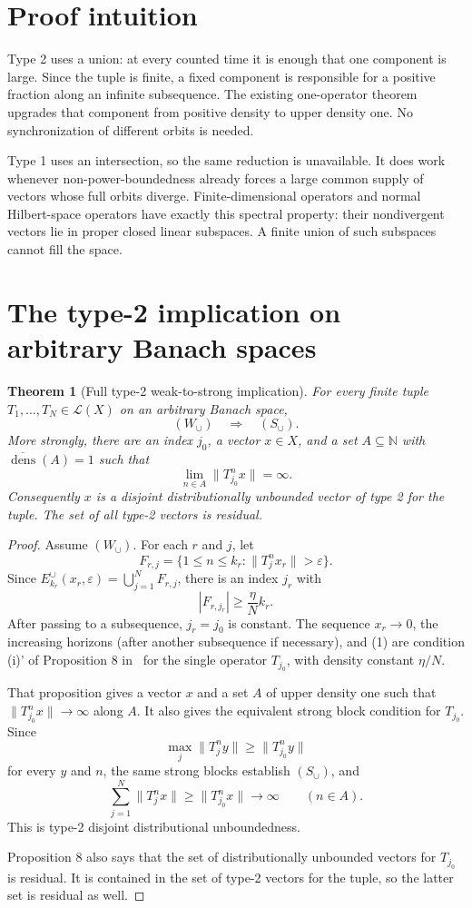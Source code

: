 \documentclass[11pt]{article}
\newtheorem{theorem}{Theorem}
\newcommand{\N}{\mathbb N}
\newcommand{\cL}{\mathcal L}
\newcommand{\dens}{\operatorname{dens}}
\begin{document}
\section{Proof intuition}

Type 2 uses a union: at every counted time it is enough that one component is
large.  Since the tuple is finite, a fixed component is responsible for a
positive fraction along an infinite subsequence.  The existing
one-operator theorem upgrades that component from positive density to upper
density one.  No synchronization of different orbits is needed.

Type 1 uses an intersection, so the same reduction is unavailable.  It does
work whenever non-power-boundedness already forces a large common supply of
vectors whose full orbits diverge.  Finite-dimensional operators and normal
Hilbert-space operators have exactly this spectral property: their
nondivergent vectors lie in proper closed linear subspaces.  A finite union of
such subspaces cannot fill the space.

\section{The type-2 implication on arbitrary Banach spaces}

\begin{theorem}[Full type-2 weak-to-strong implication]\label{thm:type2}
For every finite tuple $T_1,\ldots,T_N\in\cL(X)$ on an arbitrary Banach
space,
\[
 (W_\cup)\quad\Longrightarrow\quad(S_\cup).
\]
More strongly, there are an index $j_0$, a vector $x\in X$, and a set
$A\subseteq\N$ with $\overline{\dens}(A)=1$ such that
\[
 \lim_{n\in A}\|T_{j_0}^nx\|=\infty.
\]
Consequently $x$ is a disjoint distributionally unbounded vector of type 2
for the tuple.  The set of all type-2 vectors is residual.
\end{theorem}

\begin{proof}
Assume $(W_\cup)$.  For each $r$ and $j$, let
\[
 F_{r,j}=\{1\leq n\leq k_r:\|T_j^nx_r\|>\varepsilon\}.
\]
Since $E_{k_r}^\cup(x_r,\varepsilon)=\bigcup_{j=1}^NF_{r,j}$, there is an
index $j_r$ with
\[
 |F_{r,j_r}|\geq\frac{\eta}{N}k_r.                         \tag{1}
\]
After passing to a subsequence, $j_r=j_0$ is constant.  The sequence
$x_r\to0$, the increasing horizons (after another subsequence if necessary),
and (1) are condition (i)' of Proposition 8 in~\cite{BBMP} for the single
operator $T_{j_0}$, with density constant $\eta/N$.

That proposition gives a vector $x$ and a set $A$ of upper density one such
that $\|T_{j_0}^nx\|\to\infty$ along $A$.  It also gives the equivalent
strong block condition for $T_{j_0}$.  Since
\[
 \max_j\|T_j^ny\|\geq\|T_{j_0}^ny\|
\]
for every $y$ and $n$, the same strong blocks establish $(S_\cup)$, and
\[
 \sum_{j=1}^N\|T_j^nx\|\geq\|T_{j_0}^nx\|\longrightarrow\infty
 \qquad(n\in A).
\]
This is type-2 disjoint distributional unboundedness.

Proposition 8 also says that the set of distributionally unbounded vectors
for $T_{j_0}$ is residual.  It is contained in the set of type-2 vectors for
the tuple, so the latter set is residual as well.
\end{proof}
\end{document}

